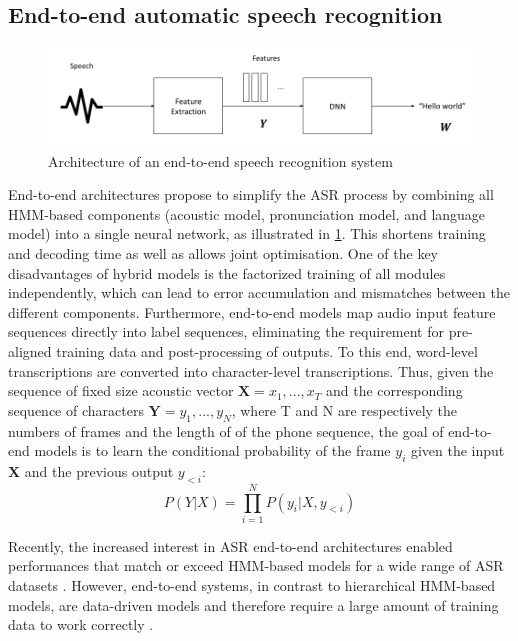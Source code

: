 \subsection{End-to-end automatic speech recognition} %
\begin{figure}
    \centering
    \includegraphics[width=\textwidth]{imgs/End2End architeccture.png}
    \caption{Architecture of an end-to-end speech recognition system}
    \label{fig:e2e_archi}
\end{figure}
End-to-end architectures propose to simplify the ASR process by combining all HMM-based components (acoustic model, pronunciation model, and language model) into a single neural network, as illustrated in \ref{fig:e2e_archi}. This shortens training and decoding time as well as allows joint optimisation. One of the key disadvantages of hybrid models is the factorized training of all modules independently, which can lead to error accumulation and mismatches between the different components. Furthermore, end-to-end models map audio input feature sequences directly into label sequences, eliminating the requirement for pre-aligned training data and post-processing of outputs. To this end, word-level transcriptions are converted into character-level transcriptions. Thus, given the sequence of fixed size acoustic vector $\boldsymbol{X}=x_1,...,x_T$ and the corresponding sequence of characters $\boldsymbol{Y}=y_1,...,y_N$, where T and N are respectively the numbers of frames and the length of of the phone sequence, the goal of end-to-end models is to learn the conditional probability of the frame $y_i$ given the input $\boldsymbol{X}$ and the previous output $y_{<i}$: 
 \begin{equation}
     P(Y|X) = \prod_{i=1}^{N}P(y_i | X,y_{<i})
 \end{equation}
 
Recently, the increased interest in ASR end-to-end architectures enabled performances that match or exceed HMM-based models for a wide range of ASR datasets \cite{hannun2014deep,hmmvse2e}. However, end-to-end systems, in contrast to hierarchical HMM-based models, are data-driven models and therefore require a large amount of training data to work correctly \cite{hmm-end2end}.
 
